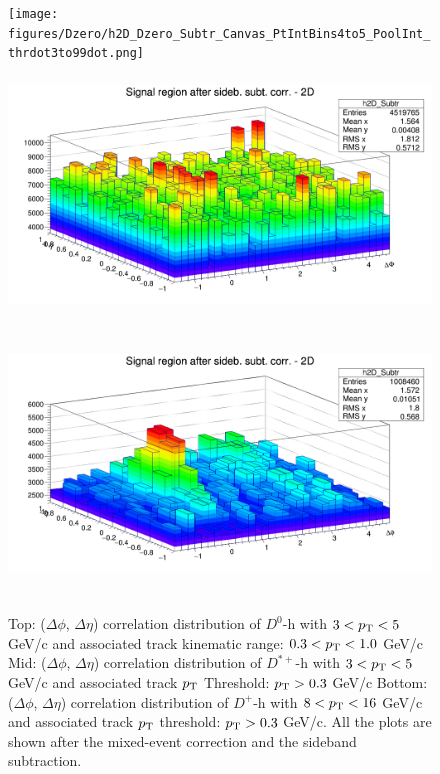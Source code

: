 \begin{figure}
\centering
{\texttt{[image: figures/Dzero/h2D\_Dzero\_Subtr\_Canvas\_PtIntBins4to5\_PoolInt\_thrdot3to99dot.png]}}
{\includegraphics[width=0.9\linewidth, height = 7cm]{figures/Dstar_wEFF/h2D_Dstar_Subtr_Canvas_PtIntBins2to3_PoolInt_thr0dot3to99dot0.png}}
{\includegraphics[width=0.9\linewidth, height = 7cm]{figures/DplusPlotsweff/h2D_Dplus_Subtr_Canvas_PtIntBins8to10_PoolInt_thr0dot3to99dot0.png}}
\caption{Top: ($\Delta\phi$, $\Delta\eta$) correlation distribution of $D^{0}$-h with $3 < p_{\rm T} < 5$ GeV/c and associated track kinematic range: $0.3 < p_{\rm T} < 1.0$ GeV/c
Mid: ($\Delta\phi$, $\Delta\eta$) correlation distribution of $D^{*+}$-h with $3 < p_{\rm T} < 5$ GeV/c and associated track $p_{\rm T}$ Threshold: $p_{\rm T} > 0.3$ GeV/c
Bottom: ($\Delta\phi$, $\Delta\eta$) correlation distribution of $D^{+}$-h with $8 < p_{\rm T} < 16$ GeV/c and associated track $p_{\rm T}$ threshold: $p_{\rm T} > 0.3$ GeV/c. All the plots are shown after the mixed-event correction and the sideband subtraction.}
\label{fig:Dsubtr2D}

\end{figure}
\clearpage
%

